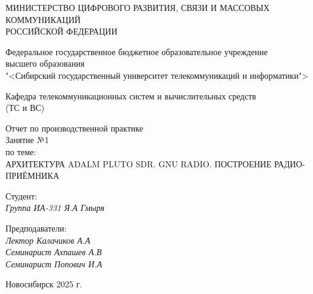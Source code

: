 \thispagestyle{empty}

\begin{center}
    МИНИСТЕРСТВО ЦИФРОВОГО РАЗВИТИЯ, СВЯЗИ И МАССОВЫХ КОММУНИКАЦИЙ \\ РОССИЙСКОЙ ФЕДЕРАЦИИ

    \vspace{20pt}

    Федеральное государственное бюджетное образовательное учреждение  \\  высшего образования \\
    "<Сибирский государственный университет телекоммуникаций и информатики"> \\

    \vspace{20pt}

    Кафедра телекоммуникационных систем и вычислительных средств \\  (ТС и ВС)
\end{center}

\vfill

\begin{center}
    Отчет по производственной практике \\  
    Занятие №1 \\
    \vspace{20pt}
    по теме: \\
    \uppercase{Архитектура Adalm Pluto SDR. GNU Radio. Построение радио-приёмника}
\end{center}

\vfill

    \noindent Студент: \\
    \textit{Группа ИА-331 \hfill Я.А Гмыря}

    \vspace{20pt}

    \noindent Предподаватели: \\
    \textit{Лектор \hfill Калачиков А.А} \\
    \textit{Семинарист \hfill Ахпашев А.В} \\
    \textit{Семинарист \hfill Попович И.А}

\vfill

\begin{center}
    Новосибирск 2025 г.
\end{center}